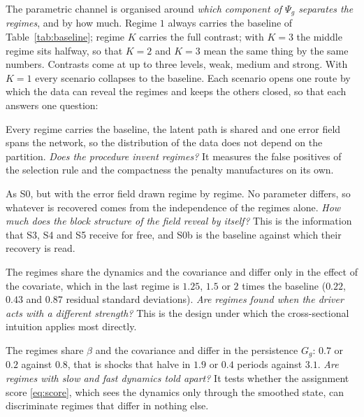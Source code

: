 The parametric channel is organised around \emph{which component of $\Psi_g$ separates the regimes}, and by how much. Regime $1$ always carries the baseline of Table~\ref{tab:baseline}; regime $K$ carries the full contrast; with $K=3$ the middle regime sits halfway, so that $K=2$ and $K=3$ mean the same thing by the same numbers. Contrasts come at up to three levels, weak, medium and strong. With $K=1$ every scenario collapses to the baseline. Each scenario opens one route by which the data can reveal the regimes and keeps the others closed, so that each answers one question:

\begin{description}[leftmargin=1.2em,itemsep=3pt,topsep=3pt]
  \item[\textbf{S0 --- no separation.}] Every regime carries the baseline, the latent path is shared and one error field spans the network, so the distribution of the data does not depend on the partition. \emph{Does the procedure invent regimes?} It measures the false positives of the selection rule and the compactness the penalty manufactures on its own.
  \item[\textbf{S0b --- no separation, error field by regime.}] As S0, but with the error field drawn regime by regime. No parameter differs, so whatever is recovered comes from the independence of the regimes alone. \emph{How much does the block structure of the field reveal by itself?} This is the information that S3, S4 and S5 receive for free, and S0b is the baseline against which their recovery is read.
  \item[\textbf{S1 --- separation in the regression coefficients.}] The regimes share the dynamics and the covariance and differ only in the effect of the covariate, which in the last regime is $1.25$, $1.5$ or $2$ times the baseline ($0.22$, $0.43$ and $0.87$ residual standard deviations). \emph{Are regimes found when the driver acts with a different strength?} This is the design under which the cross-sectional intuition applies most directly.
  \item[\textbf{S2 --- separation in the latent dynamics.}] The regimes share $\beta$ and the covariance and differ in the persistence $G_g$: $0.7$ or $0.2$ against $0.8$, that is shocks that halve in $1.9$ or $0.4$ periods against $3.1$. \emph{Are regimes with slow and fast dynamics told apart?} It tests whether the assignment score \eqref{eq:score}, which sees the dynamics only through the smoothed state, can discriminate regimes that differ in nothing else.

\end{description}
